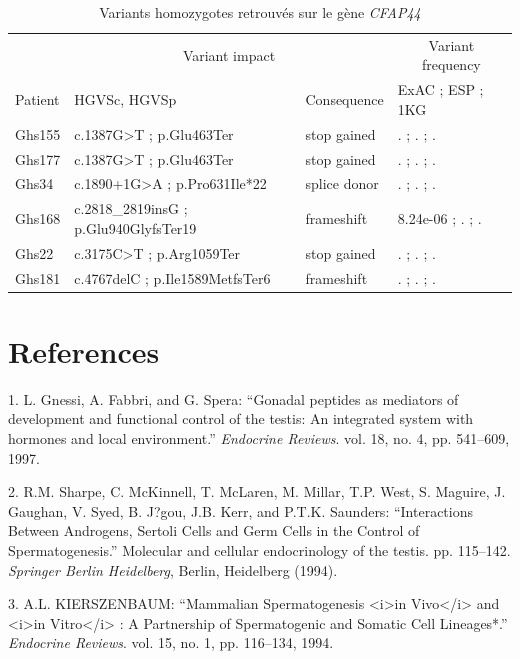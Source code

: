 \documentclass[12pt,a4paper,twoside]{ugathesis}
\theoremstyle{definition}
\theoremstyle{definition}
\theoremstyle{definition}
\theoremstyle{remark}
\begin{document}
\begin{longtable}[t]{llll}
\caption{\label{tab:tabcfap44}Variants homozygotes retrouvés sur le gène \textit{CFAP44}}\\
\toprule
\multicolumn{1}{c}{ } & \multicolumn{2}{c}{Variant impact} & \multicolumn{1}{c}{Variant frequency} \\
\cmidrule(l{2pt}r{2pt}){2-3} \cmidrule(l{2pt}r{2pt}){4-4}
Patient & HGVSc, HGVSp & Consequence & ExAC ; ESP ; 1KG\\
\midrule
Ghs155 & c.1387G>T ; p.Glu463Ter & stop gained & . ; . ; .\\
Ghs177 & c.1387G>T ; p.Glu463Ter & stop gained & . ; . ; .\\
Ghs34 & c.1890+1G>A ; p.Pro631Ile*22 & splice donor & . ; . ; .\\
Ghs168 & c.2818\_2819insG ; p.Glu940GlyfsTer19 & frameshift & 8.24e-06 ; . ; .\\
Ghs22 & c.3175C>T ; p.Arg1059Ter & stop gained & . ; . ; .\\
Ghs181 & c.4767delC ; p.Ile1589MetfsTer6 & frameshift & . ; . ; .\\
\bottomrule
\end{longtable}

\backmatter

\chapter*{References}\label{references}

\noindent

\setlength{\parindent}{-0.20in} \setlength{\leftskip}{0.20in}
\setlength{\parskip}{8pt}

\hypertarget{refs}{}
\hypertarget{ref-Gnessi1997}{}
1. L. Gnessi, A. Fabbri, and G. Spera: ``Gonadal peptides as mediators
of development and functional control of the testis: An integrated
system with hormones and local environment.'' \emph{Endocrine Reviews}.
vol. 18, no. 4, pp. 541--609, 1997.

\hypertarget{ref-Sharpe1994}{}
2. R.M. Sharpe, C. McKinnell, T. McLaren, M. Millar, T.P. West, S.
Maguire, J. Gaughan, V. Syed, B. J?gou, J.B. Kerr, and P.T.K. Saunders:
``Interactions Between Androgens, Sertoli Cells and Germ Cells in the
Control of Spermatogenesis.'' Molecular and cellular endocrinology of
the testis. pp. 115--142. \emph{Springer Berlin Heidelberg}, Berlin,
Heidelberg (1994).

\hypertarget{ref-KIERSZENBAUM1994}{}
3. A.L. KIERSZENBAUM: ``Mammalian Spermatogenesis
\textless{}i\textgreater{}in Vivo\textless{}/i\textgreater{} and
\textless{}i\textgreater{}in Vitro\textless{}/i\textgreater{} : A
Partnership of Spermatogenic and Somatic Cell Lineages*.''
\emph{Endocrine Reviews}. vol. 15, no. 1, pp. 116--134, 1994.
\end{document}

